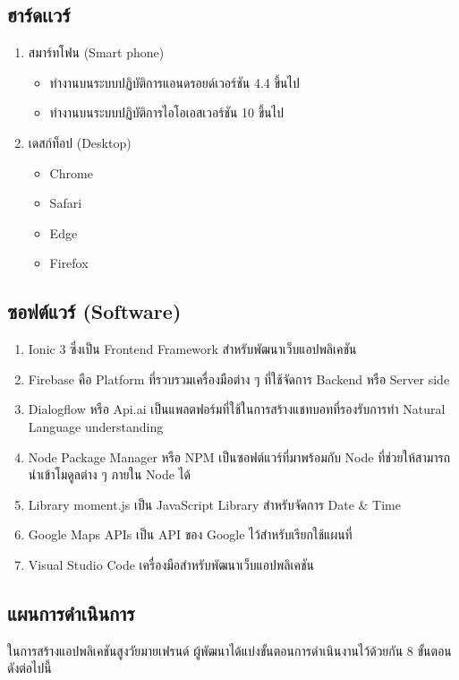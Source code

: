 \subsection{ฮาร์ดเเวร์}
\begin{enumerate}
	\item สมาร์ทโฟน (Smart phone)
		\begin{itemize}
			\item ทำงานบนระบบปฏิบัติการแอนดรอยด์เวอร์ชัน 4.4 ขึ้นไป
			\item ทำงานบนระบบปฏิบัติการไอโอเอสเวอร์ชัน 10 ขึ้นไป
		\end{itemize}
		\item เดสก์ท็อป (Desktop)
		\begin{itemize}
			\item Chrome
			\item Safari
			\item Edge
			\item Firefox
		\end{itemize}
\end{enumerate}

\subsection{ซอฟต์แวร์ (Software)}
\begin{enumerate}
	\item Ionic 3 ซึ่งเป็น Frontend Framework สำหรับพัฒนาเว็บแอปพลิเคชัน
	\item Firebase คือ Platform ที่รวบรวมเครื่องมือต่าง ๆ ที่ใช้จัดการ Backend หรือ Server side
	\item Dialogflow หรือ Api.ai เป็นแพลตฟอร์มที่ใช้ในการสร้างแชทบอทที่รองรับการทำ Natural Language understanding
	\item Node Package Manager หรือ NPM เป็นซอฟต์แวร์ที่มาพร้อมกับ Node ที่ช่วยให้สามารถนำเข้าโมดูลต่าง ๆ ภายใน Node ได้
	\item Library moment.js เป็น JavaScript Library สำหรับจัดการ Date & Time
	\item Google Maps APIs เป็น API ของ Google ไว้สำหรับเรียกใช้แผนที่
	\item Visual Studio Code เครื่องมือสำหรับพัฒนาเว็บแอปพลิเคชัน
\end{enumerate}

\newpage
\subsection{แผนการดำเนินการ}
	ในการสร้างแอปพลิเคชันสูงวัยมายเฟรนด์ ผู้พัฒนาได้แบ่งขั้นตอนการดำเนินงานไว้ด้วยกัน 8 ขั้นตอน ดังต่อไปนี้

